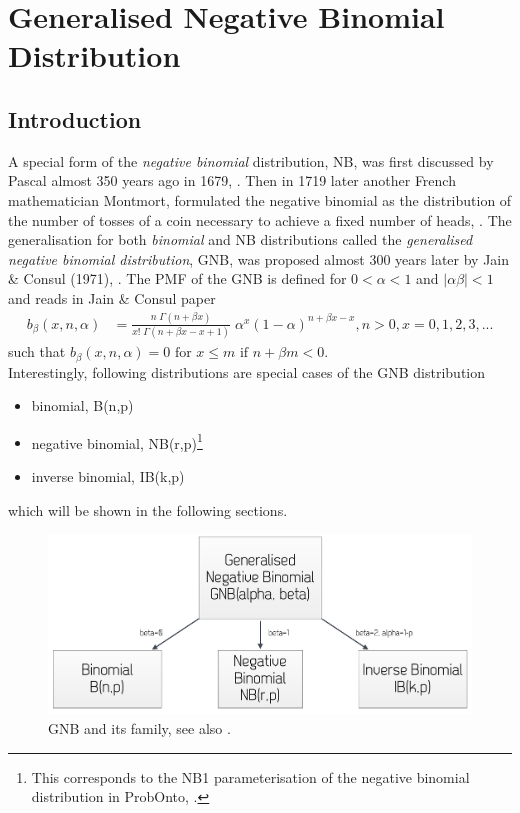 \newpage
\section{Generalised Negative Binomial Distribution}
\subsection*{Introduction}
A special form of the \emph{negative binomial} distribution, NB, was first 
discussed by Pascal almost 350 years ago in 1679, \cite{dodge2008concise,johnson2005univariate}. 
Then in 1719 later another French mathematician Montmort, formulated the negative 
binomial as the distribution of the number of tosses of a coin necessary 
to achieve a fixed number of heads, \cite{tripathi2006negative}.
The generalisation for both \emph{binomial} and NB distributions called the 
\emph{generalised negative binomial distribution}, GNB, was proposed 
almost 300 years later by Jain \& Consul (1971), \cite{jain1971generalized}. 
The PMF of the GNB is defined for $0<\alpha<1$ and $|\alpha \beta| < 1$ 
and reads in Jain \& Consul paper
\begin{align*}
b_{\beta}(x,n,\alpha) &= 
\frac{n \; \Gamma(n+\beta x)}{x! \;\Gamma(n + \beta x - x +1)}  \; \alpha^x (1-\alpha)^{n+\beta x-x}, n>0, x=0,1,2,3,...
\end{align*}
such that $b_{\beta}(x,n,\alpha) = 0 \text{ for } x \leq m \text{ if } n+\beta m < 0.$\\
Interestingly, following distributions are special cases of the GNB distribution
\begin{itemize}
\item 
binomial, B(n,p)
\item 
negative binomial, NB(r,p)\footnote{This corresponds to the NB1 parameterisation 
of the negative binomial distribution in ProbOnto, \cite{Swat:2015a}.}
\item 
inverse binomial, IB(k,p)
\end{itemize}
which will be shown in the following sections. 

\begin{figure}[ht!]
\centering
  \includegraphics[width=120mm]{pics/GNBspecialCases.pdf}
 \caption{GNB and its family, see also \cite{Consul:2006qf}.}
 \label{fig:GNBspecialCases}
\end{figure}

